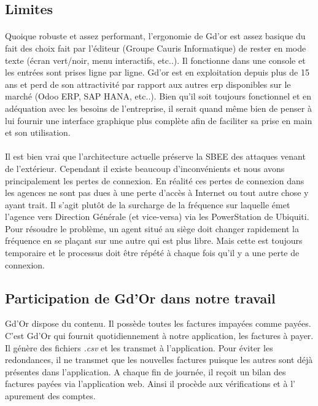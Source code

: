 
      \subsection{Limites}
	\paragraph{}
	  Quoique robuste et assez performant, l'ergonomie de Gd'or est assez basique du fait des choix fait par l'éditeur (Groupe Cauris Informatique) de rester en mode texte (écran vert/noir, menu interactifs, etc..). Il fonctionne dans une console et les entr\'ees sont prises ligne par ligne. Gd'or est en exploitation depuis plus de 15 ans et perd de son attractivité par rapport aux autres \gls{erp} disponibles sur le marché (Odoo ERP, SAP HANA, etc..). Bien qu'il soit toujours fonctionnel et en ad\'equation avec les besoins de l'entreprise, il serait quand m\^eme bien de penser \`a lui fournir une interface graphique plus compl\`ete afin de faciliter sa prise en main et son utilisation. 
	  
	\paragraph{}
	  Il est bien vrai que l'architecture actuelle pr\'eserve la SBEE des attaques venant de l'ext\'erieur. Cependant il existe beaucoup d'inconv\'enients et nous avons principalement les pertes de connexion. En r\'ealit\'e ces pertes de connexion dans les agences ne sont pas dues \`a une perte d'acc\`es \`a Internet ou tout autre chose y ayant trait. Il s'agit plut\^ot de la surcharge de la fr\'equence sur laquelle \'emet l'agence vers Direction G\'en\'erale (et vice-versa) via les PowerStation de Ubiquiti. Pour r\'esoudre le probl\`eme, un agent situ\'e au si\`ege doit changer rapidement la fr\'equence en se pla\c{c}ant sur une autre qui est plus libre. Mais cette est toujours temporaire et le processus doit \^etre r\'ep\'et\'e \`a chaque fois qu'il y a une perte de connexion.

    \subsection{Participation de Gd'Or dans notre travail}
      Gd'Or dispose du contenu. Il poss\`ede toutes les factures impay\'ees comme pay\'ees. C'est Gd'Or qui fournit quotidiennement \`a notre application, les factures \`a payer. Il g\'en\`ere des fichiers \textit{.csv} et les transmet \`a l'application. Pour \'eviter les redondances, il ne transmet que les nouvelles factures puisque les autres sont d\'ej\`a pr\'esentes dans l'application. A chaque fin de journ\'ee, il re\c{c}oit un bilan des factures pay\'ees via l'application web. Ainsi il proc\`ede aux v\'erifications et \`a l' apurement des comptes.
      
      